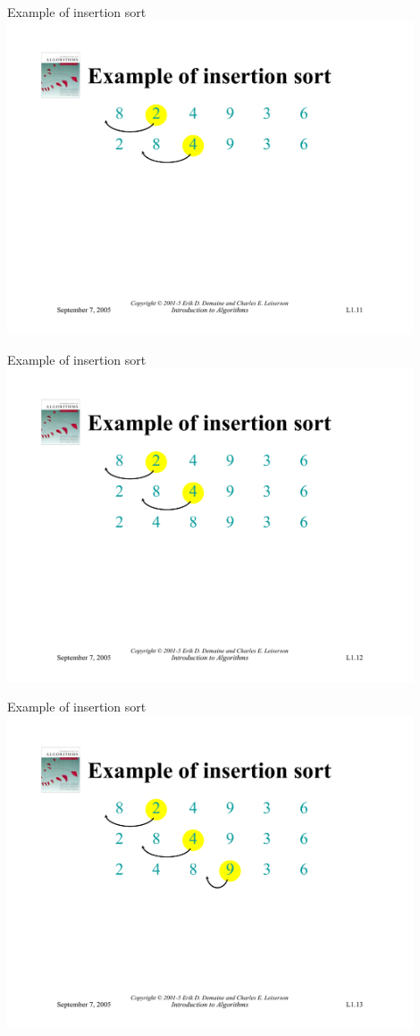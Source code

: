 \documentclass{beamer}
\begin{document}
\begin{frame}{Example of insertion sort}
    \centering
    \includegraphics[width=0.9\textwidth, trim={5cm 2.95cm 5cm 4.25cm}, clip]{pages/lec1_11}
\end{frame}
\begin{frame}{Example of insertion sort}
    \centering
    \includegraphics[width=0.9\textwidth, trim={5cm 2.95cm 5cm 4.25cm}, clip]{pages/lec1_12}
\end{frame}
\begin{frame}{Example of insertion sort}
    \centering
    \includegraphics[width=0.9\textwidth, trim={5cm 2.95cm 5cm 4.25cm}, clip]{pages/lec1_13}
\end{frame}
\end{document}
